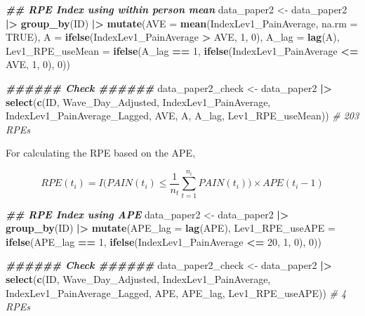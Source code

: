 \documentclass[
  12pt,
]{article}
\newenvironment{Shaded}{\begin{snugshade}}{\end{snugshade}}
\newcommand{\AttributeTok}[1]{\textcolor[rgb]{0.13,0.29,0.53}{#1}}
\newcommand{\CommentTok}[1]{\textcolor[rgb]{0.56,0.35,0.01}{\textit{#1}}}
\newcommand{\ConstantTok}[1]{\textcolor[rgb]{0.56,0.35,0.01}{#1}}
\newcommand{\DecValTok}[1]{\textcolor[rgb]{0.00,0.00,0.81}{#1}}
\newcommand{\DocumentationTok}[1]{\textcolor[rgb]{0.56,0.35,0.01}{\textbf{\textit{#1}}}}
\newcommand{\FunctionTok}[1]{\textcolor[rgb]{0.13,0.29,0.53}{\textbf{#1}}}
\newcommand{\NormalTok}[1]{#1}
\newcommand{\OtherTok}[1]{\textcolor[rgb]{0.56,0.35,0.01}{#1}}
\newcommand{\SpecialCharTok}[1]{\textcolor[rgb]{0.81,0.36,0.00}{\textbf{#1}}}
\begin{document}
\begin{Shaded}
\begin{Highlighting}[]
\DocumentationTok{\#\# RPE Index using within person mean}
\NormalTok{data\_paper2 }\OtherTok{\textless{}{-}}\NormalTok{ data\_paper2 }\SpecialCharTok{|\textgreater{}}
  \FunctionTok{group\_by}\NormalTok{(ID) }\SpecialCharTok{|\textgreater{}}
  \FunctionTok{mutate}\NormalTok{(}\AttributeTok{AVE =} \FunctionTok{mean}\NormalTok{(IndexLev1\_PainAverage, }\AttributeTok{na.rm =} \ConstantTok{TRUE}\NormalTok{),}
         \AttributeTok{A =} \FunctionTok{ifelse}\NormalTok{(IndexLev1\_PainAverage }\SpecialCharTok{\textgreater{}}\NormalTok{ AVE, }\DecValTok{1}\NormalTok{, }\DecValTok{0}\NormalTok{),}
         \AttributeTok{A\_lag =} \FunctionTok{lag}\NormalTok{(A),}
         \AttributeTok{Lev1\_RPE\_useMean =} \FunctionTok{ifelse}\NormalTok{(A\_lag }\SpecialCharTok{==} \DecValTok{1}\NormalTok{, }
                                   \FunctionTok{ifelse}\NormalTok{(IndexLev1\_PainAverage }\SpecialCharTok{\textless{}=}\NormalTok{ AVE, }\DecValTok{1}\NormalTok{, }\DecValTok{0}\NormalTok{), }\DecValTok{0}\NormalTok{)) }

\DocumentationTok{\#\#\#\#\#\# Check \#\#\#\#\#\#}
\NormalTok{data\_paper2\_check }\OtherTok{\textless{}{-}}\NormalTok{ data\_paper2 }\SpecialCharTok{|\textgreater{}}
  \FunctionTok{select}\NormalTok{(}\FunctionTok{c}\NormalTok{(ID, Wave\_Day\_Adjusted, IndexLev1\_PainAverage, IndexLev1\_PainAverage\_Lagged, }
\NormalTok{           AVE, A, A\_lag, Lev1\_RPE\_useMean))}
\CommentTok{\# 203 RPEs}
\end{Highlighting}
\end{Shaded}

For calculating the RPE based on the APE,

\[
RPE(t_i)=I\Big(PAIN(t_i)\leq \frac{1}{n_t}\sum_{t=1}^{n_i}PAIN(t_i)\Big)\times APE(t_i-1)
\]

\begin{Shaded}
\begin{Highlighting}[]
\DocumentationTok{\#\# RPE Index using APE}
\NormalTok{data\_paper2 }\OtherTok{\textless{}{-}}\NormalTok{ data\_paper2 }\SpecialCharTok{|\textgreater{}}
  \FunctionTok{group\_by}\NormalTok{(ID) }\SpecialCharTok{|\textgreater{}}
  \FunctionTok{mutate}\NormalTok{(}\AttributeTok{APE\_lag =} \FunctionTok{lag}\NormalTok{(APE), }
         \AttributeTok{Lev1\_RPE\_useAPE =} \FunctionTok{ifelse}\NormalTok{(APE\_lag }\SpecialCharTok{==} \DecValTok{1}\NormalTok{, }
                                   \FunctionTok{ifelse}\NormalTok{(IndexLev1\_PainAverage }\SpecialCharTok{\textless{}=} \DecValTok{20}\NormalTok{, }\DecValTok{1}\NormalTok{, }\DecValTok{0}\NormalTok{), }\DecValTok{0}\NormalTok{)) }

\DocumentationTok{\#\#\#\#\#\# Check \#\#\#\#\#\#}
\NormalTok{data\_paper2\_check }\OtherTok{\textless{}{-}}\NormalTok{ data\_paper2 }\SpecialCharTok{|\textgreater{}}
  \FunctionTok{select}\NormalTok{(}\FunctionTok{c}\NormalTok{(ID, Wave\_Day\_Adjusted, IndexLev1\_PainAverage, IndexLev1\_PainAverage\_Lagged, }
\NormalTok{           APE, APE\_lag, Lev1\_RPE\_useAPE))}
\CommentTok{\# 4 RPEs}
\end{Highlighting}
\end{Shaded}
\end{document}
